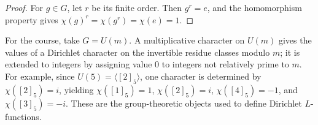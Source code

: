 \begin{proof}
For $g\in G$, let $r$ be its finite order. Then $g^r=e$, and the homomorphism property gives $\chi(g)^r=\chi(g^r)=\chi(e)=1$.
\end{proof}

For the course, take $G=U(m)$. A multiplicative character on $U(m)$ gives the values of a Dirichlet character on the invertible residue classes modulo $m$; it is extended to integers by assigning value $0$ to integers not relatively prime to $m$. For example, since $U(5)=\langle[2]_5\rangle$, one character is determined by $\chi([2]_5)=i$, yielding $\chi([1]_5)=1$, $\chi([2]_5)=i$, $\chi([4]_5)=-1$, and $\chi([3]_5)=-i$. These are the group-theoretic objects used to define Dirichlet $L$-functions.
